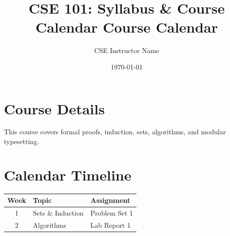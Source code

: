 \documentclass[11pt,a4paper]{article}
\title{\bfseries CSE 101: Syllabus \Syllabus & Course Calendar Course Calendar}
\author{CSE Instructor Name}
\date{\today}
\begin{document}
\maketitle

\section{Course Details}
This course covers formal proofs, induction, sets, algorithms, and modular typesetting.

\section{Calendar Timeline}
\begin{table}[h]
    \centering
    \begin{tabular}{cll}
        \toprule
        Week & Topic & Assignment \\
        \midrule
        1 & Sets \& Induction & Problem Set 1 \\
        2 & Algorithms & Lab Report 1 \\
        \bottomrule
    \end{tabular}
\end{table}
\end{document}

